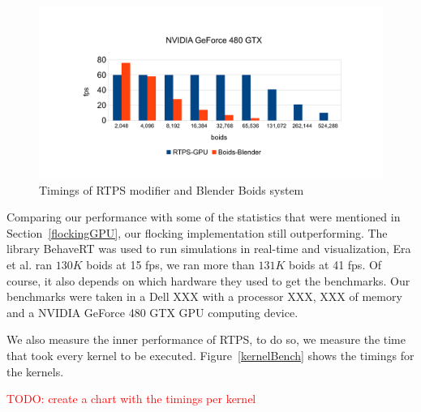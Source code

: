 \begin{figure}[htbp]
\begin{center}
\includegraphics[scale=0.45]{figures/benchmarks.pdf}
\caption{Timings of RTPS modifier and Blender Boids system}
\label{plot}
\end{center}
\end{figure}

Comparing our performance with some of the statistics that were mentioned in Section~\ref{flockingGPU}, our flocking implementation still outperforming. The library BehaveRT was used to run simulations in real-time and visualization, Era et al. ran $130K$ boids at 15 fps, we ran more than $131K$ boids at 41 fps. Of course, it also depends on which hardware they used to get the benchmarks. Our benchmarks were taken in a Dell XXX with a processor XXX, XXX of memory and a NVIDIA GeForce 480 GTX GPU computing device. 

We also measure the inner performance of RTPS, to do so, we measure the time that took every kernel to be executed. Figure~\ref{kernelBench} shows the timings for the kernels.

\textcolor{red}{TODO: create a chart with the timings per kernel}


